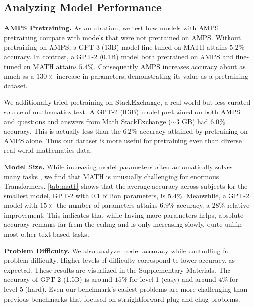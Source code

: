 \subsection{Analyzing Model Performance}

\textbf{AMPS Pretraining.}\quad 
As an ablation, we test how models with AMPS pretraining compare with models that were not pretrained on AMPS. Without pretraining on AMPS, a GPT-3 (13B) model fine-tuned on MATH attains $5.2\%$ accuracy. In contrast, a GPT-2 (0.1B) model both pretrained on AMPS and fine-tuned on MATH attains $5.4\%$. 
Consequently AMPS increases accuracy about as much as a $130\times$ increase in parameters, demonstrating its value as a pretraining dataset.

We additionally tried pretraining on StackExchange, a real-world but less  curated source of mathematics text. A GPT-2 (0.3B) model pretrained on both AMPS and questions and answers from Math StackExchange ($\sim\!3$ GB) had $6.0\%$ accuracy. This is actually less than the $6.2\%$ accuracy attained by pretraining on AMPS alone. Thus our dataset is more useful for pretraining even than diverse real-world mathematics data.

\textbf{Model Size.}\quad 
While increasing model parameters often automatically solves many tasks \citep{Brown2020LanguageMA}, we find that MATH is unusually challenging for enormous Transformers. \ref{tab:math} shows that the average accuracy across subjects for the smallest model, GPT-2 with 0.1 billion parameters, is $5.4\%$. Meanwhile, a GPT-2 model with $15\times$ the number of parameters attains $6.9\%$ accuracy, a $28\%$ relative improvement. This indicates that while having more parameters helps, absolute accuracy remains far from the ceiling and is only increasing slowly, quite unlike most other text-based tasks. 

\textbf{Problem Difficulty.}\quad
We also analyze model accuracy while controlling for problem difficulty. Higher levels of difficulty correspond to lower accuracy, as expected. These results are visualized in the Supplementary Materials. The accuracy of GPT-2 (1.5B) is around $15\%$ for level 1 (easy) and around $4\%$ for level 5 (hard). Even our benchmark's easiest problems are more challenging than previous benchmarks that focused on straightforward plug-and-chug problems.

